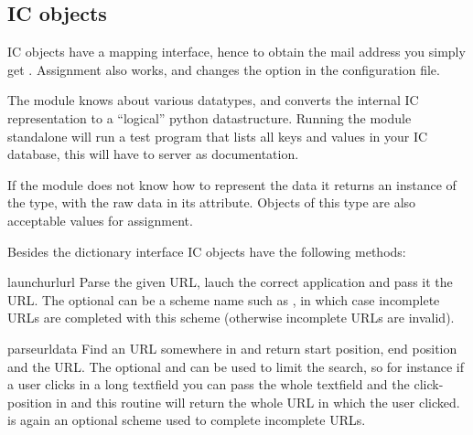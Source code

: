 \subsection{IC objects}

IC objects have a mapping interface, hence to obtain the mail address
you simply get . Assignment also works, and
changes the option in the configuration file.

The module knows about various datatypes, and converts the internal IC
representation to a ``logical'' python datastructure. Running the
 module standalone will run a test program that lists all
keys and values in your IC database, this will have to server as
documentation.

If the module does not know how to represent the data it returns an
instance of the  type, with the raw data in its
 attribute. Objects of this type are also acceptable values
for assignment.

Besides the dictionary interface IC objects have the following methods:

\renewcommand{\indexsubitem}{(IC object attribute)}

\begin{funcdesc}{launchurl}{url }
Parse the given URL, lauch the correct application and pass it the
URL. The optional  can be a scheme name such as
, in which case incomplete URLs are completed with this
scheme (otherwise incomplete URLs are invalid). 
\end{funcdesc}

\begin{funcdesc}{parseurl}{data }
Find an URL somewhere in  and return start position, end
position and the URL. The optional  and  can be
used to limit the search, so for instance if a user clicks in a long
textfield you can pass the whole textfield and the click-position in
 and this routine will return the whole URL in which the
user clicked.  is again an optional scheme used to complete
incomplete URLs.
\end{funcdesc}

